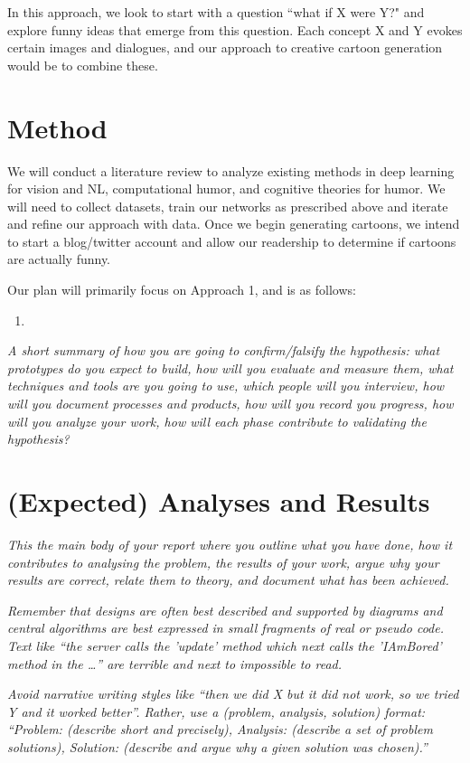\documentclass[letter]{article}
\begin{document}
In this approach, we look to start with a question ``what if X were Y?" and explore funny ideas that emerge from this question. Each concept X and Y evokes certain images and dialogues, and our approach to creative cartoon generation would be to combine these. 

\section{Method}

We will conduct a literature review to analyze existing methods in deep learning for vision and NL, computational humor, and cognitive theories for humor. We will need to collect datasets, train our networks as prescribed above and iterate and refine our approach with data. Once we begin generating cartoons, we intend to start a blog/twitter account and allow our readership to determine if cartoons are actually funny. 

Our plan will primarily focus on Approach 1, and is as follows:
\begin{enumerate}
	\item 
\end{enumerate}


\textit{A short summary of how you are going to confirm/falsify the
hypothesis: what prototypes do you expect to build, how will you
evaluate and measure them, what techniques and tools are you going to
use, which people will you interview, how will you document processes
and products, how will you record you progress, how will you analyze
your work, how will each phase contribute to validating the
hypothesis?}

\section{(Expected) Analyses and Results}

\textit{This the main body of your report where you outline what you have
done, how it contributes to analysing the problem, the results of your
work, argue why your results are correct, relate them to theory, and
document what has been achieved.}

\textit{Remember that designs are often best described and supported by
diagrams and central algorithms are best expressed in small fragments
of real or pseudo code. Text like ``the server calls the 'update'
method which next calls the 'IAmBored' method in the \ldots'' are
terrible and next to impossible to read.}

\textit{Avoid narrative writing styles like ``then we did X but it did not work, so
we tried Y and it worked better''. Rather, use a (problem, analysis,
solution) format: ``Problem: (describe short and precisely), Analysis:
(describe a set of problem solutions), Solution: (describe and argue
why a given solution was chosen).''}
\end{document}
